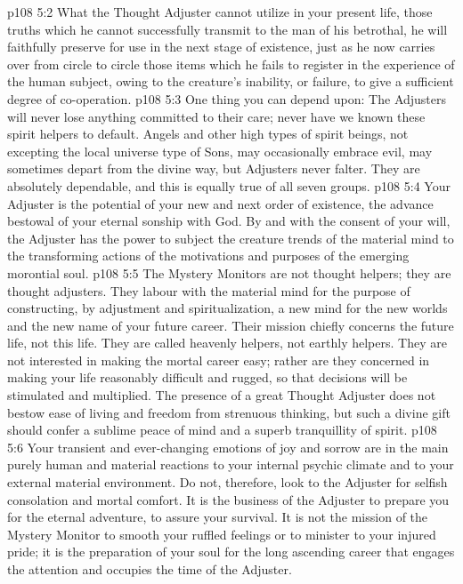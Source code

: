 \vs p108 5:2 What the Thought Adjuster cannot utilize in your present life, those truths which he cannot successfully transmit to the man of his betrothal, he will faithfully preserve for use in the next stage of existence, just as he now carries over from circle to circle those items which he fails to register in the experience of the human subject, owing to the creature’s inability, or failure, to give a sufficient degree of co\hyp{}operation.
\vs p108 5:3 One thing you can depend upon: The Adjusters will never lose anything committed to their care; never have we known these spirit helpers to default. Angels and other high types of spirit beings, not excepting the local universe type of Sons, may occasionally embrace evil, may sometimes depart from the divine way, but Adjusters never falter. They are absolutely dependable, and this is equally true of all seven groups.
\vs p108 5:4 \pc Your Adjuster is the potential of your new and next order of existence, the advance bestowal of your eternal sonship with God. By and with the consent of your will, the Adjuster has the power to subject the creature trends of the material mind to the transforming actions of the motivations and purposes of the emerging morontial soul.
\vs p108 5:5 The Mystery Monitors are not thought helpers; they are thought adjusters. They labour with the material mind for the purpose of constructing, by adjustment and spiritualization, a new mind for the new worlds and the new name of your future career. Their mission chiefly concerns the future life, not this life. They are called heavenly helpers, not earthly helpers. They are not interested in making the mortal career easy; rather are they concerned in making your life reasonably difficult and rugged, so that decisions will be stimulated and multiplied. The presence of a great Thought Adjuster does not bestow ease of living and freedom from strenuous thinking, but such a divine gift should confer a sublime peace of mind and a superb tranquillity of spirit.
\vs p108 5:6 Your transient and ever\hyp{}changing emotions of joy and sorrow are in the main purely human and material reactions to your internal psychic climate and to your external material environment. Do not, therefore, look to the Adjuster for selfish consolation and mortal comfort. It is the business of the Adjuster to prepare you for the eternal adventure, to assure your survival. It is not the mission of the Mystery Monitor to smooth your ruffled feelings or to minister to your injured pride; it is the preparation of your soul for the long ascending career that engages the attention and occupies the time of the Adjuster.
